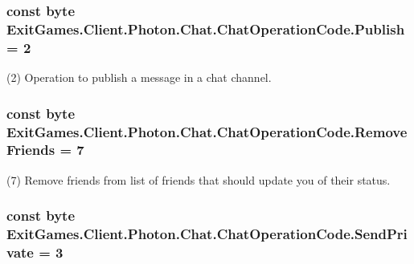 \subsubsection[{\texorpdfstring{Publish}{Publish}}]{\setlength{\rightskip}{0pt plus 5cm}const byte Exit\+Games.\+Client.\+Photon.\+Chat.\+Chat\+Operation\+Code.\+Publish = 2}\hypertarget{class_exit_games_1_1_client_1_1_photon_1_1_chat_1_1_chat_operation_code_a0f990d91b96cc9540bd90bb00e1cd59a}{}\label{class_exit_games_1_1_client_1_1_photon_1_1_chat_1_1_chat_operation_code_a0f990d91b96cc9540bd90bb00e1cd59a}


(2) Operation to publish a message in a chat channel.

\subsubsection[{\texorpdfstring{Remove\+Friends}{RemoveFriends}}]{\setlength{\rightskip}{0pt plus 5cm}const byte Exit\+Games.\+Client.\+Photon.\+Chat.\+Chat\+Operation\+Code.\+Remove\+Friends = 7}\hypertarget{class_exit_games_1_1_client_1_1_photon_1_1_chat_1_1_chat_operation_code_a5adb2a4d7ca5b4edd59bef60d9d1ccae}{}\label{class_exit_games_1_1_client_1_1_photon_1_1_chat_1_1_chat_operation_code_a5adb2a4d7ca5b4edd59bef60d9d1ccae}


(7) Remove friends from list of friends that should update you of their status.

\subsubsection[{\texorpdfstring{Send\+Private}{SendPrivate}}]{\setlength{\rightskip}{0pt plus 5cm}const byte Exit\+Games.\+Client.\+Photon.\+Chat.\+Chat\+Operation\+Code.\+Send\+Private = 3}\hypertarget{class_exit_games_1_1_client_1_1_photon_1_1_chat_1_1_chat_operation_code_abb220662c7522ea1b0943bb845b6c7dc}{}\label{class_exit_games_1_1_client_1_1_photon_1_1_chat_1_1_chat_operation_code_abb220662c7522ea1b0943bb845b6c7dc}


